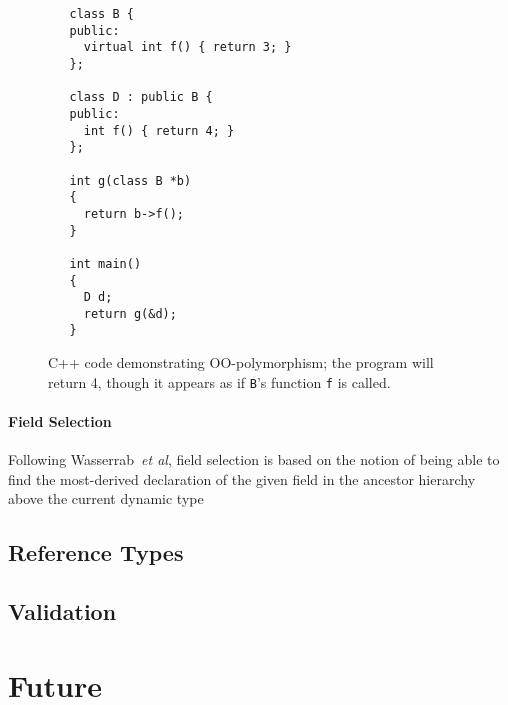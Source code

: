 \documentclass[11pt]{article}
\begin{document}
\begin{figure}[hbtp]
\begin{verbatim}
   class B {
   public:
     virtual int f() { return 3; }
   };

   class D : public B {
   public:
     int f() { return 4; }
   };

   int g(class B *b)
   {
     return b->f();
   }

   int main()
   {
     D d;
     return g(&d);
   }
\end{verbatim}
\caption{C++ code demonstrating OO-polymorphism; the program will
  return 4, though it appears as if \texttt{B}'s function \texttt{f}
  is called.}
\label{fig:oo-example}
\end{figure}


\paragraph{Field Selection}
Following Wasserrab~\emph{et al}, field selection is based on the
notion of being able to find the most-derived declaration of the given
field in the ancestor hierarchy above the current dynamic type


\subsection{Reference Types}
\label{sec:reftypes}


\subsection{Validation}
\label{sec:validation}

\section{Future}



\end{document}
